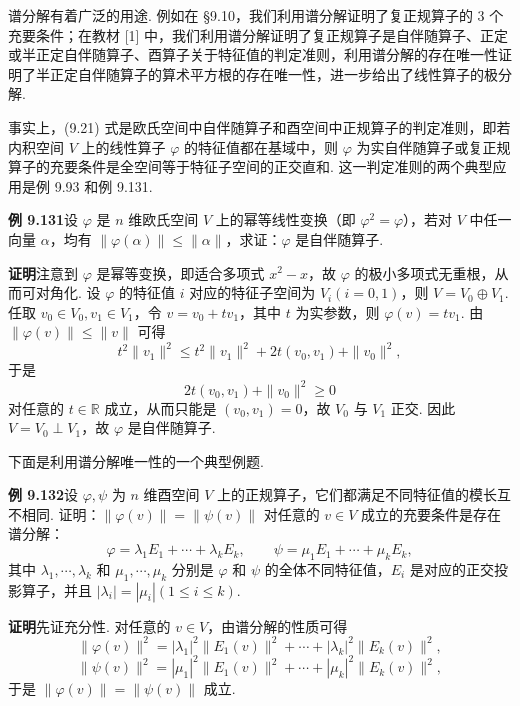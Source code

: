 \documentclass[UTF8, 12pt, fontset=fandol, oneside]{ctexart}
\begin{document}
谱分解有着广泛的用途. 例如在 §9.10，我们利用谱分解证明了复正规算子的 $3$ 个充要条件；在教材 [1] 中，我们利用谱分解证明了复正规算子是自伴随算子、正定或半正定自伴随算子、酉算子关于特征值的判定准则，利用谱分解的存在唯一性证明了半正定自伴随算子的算术平方根的存在唯一性，进一步给出了线性算子的极分解.

事实上，(9.21) 式是欧氏空间中自伴随算子和酉空间中正规算子的判定准则，即若内积空间 $V$ 上的线性算子 $\varphi$ 的特征值都在基域中，则 $\varphi$ 为实自伴随算子或复正规算子的充要条件是全空间等于特征子空间的正交直和. 这一判定准则的两个典型应用是例 9.93 和例 9.131.

\noindent\textbf{例 9.131}\quad 设 $\varphi$ 是 $n$ 维欧氏空间 $V$ 上的幂等线性变换（即 $\varphi^2=\varphi$），若对 $V$ 中任一向量 $\alpha$，均有 $\|\varphi(\alpha)\|\le\|\alpha\|$，求证：$\varphi$ 是自伴随算子.

\noindent\textbf{证明}\quad 注意到 $\varphi$ 是幂等变换，即适合多项式 $x^2-x$，故 $\varphi$ 的极小多项式无重根，从而可对角化. 设 $\varphi$ 的特征值 $i$ 对应的特征子空间为 $V_i(i=0,1)$，则 $V=V_0\oplus V_1$. 任取 $v_0\in V_0,v_1\in V_1$，令 $v=v_0+tv_1$，其中 $t$ 为实参数，则 $\varphi(v)=tv_1$. 由 $\|\varphi(v)\|\le\|v\|$ 可得
\[
t^2\|v_1\|^2\le t^2\|v_1\|^2+2t(v_0,v_1)+\|v_0\|^2,
\]
于是
\[
2t(v_0,v_1)+\|v_0\|^2\ge0
\]
对任意的 $t\in\mathbb{R}$ 成立，从而只能是 $(v_0,v_1)=0$，故 $V_0$ 与 $V_1$ 正交. 因此 $V=V_0\perp V_1$，故 $\varphi$ 是自伴随算子.

下面是利用谱分解唯一性的一个典型例题.

\noindent\textbf{例 9.132}\quad 设 $\varphi,\psi$ 为 $n$ 维酉空间 $V$ 上的正规算子，它们都满足不同特征值的模长互不相同. 证明：$\|\varphi(v)\|=\|\psi(v)\|$ 对任意的 $v\in V$ 成立的充要条件是存在谱分解：
\[
\varphi=\lambda_1E_1+\cdots+\lambda_kE_k,\qquad
\psi=\mu_1E_1+\cdots+\mu_kE_k,
\]
其中 $\lambda_1,\cdots,\lambda_k$ 和 $\mu_1,\cdots,\mu_k$ 分别是 $\varphi$ 和 $\psi$ 的全体不同特征值，$E_i$ 是对应的正交投影算子，并且 $|\lambda_i|=|\mu_i|(1\le i\le k)$.

\noindent\textbf{证明}\quad 先证充分性. 对任意的 $v\in V$，由谱分解的性质可得
\[
\|\varphi(v)\|^2=|\lambda_1|^2\|E_1(v)\|^2+\cdots+|\lambda_k|^2\|E_k(v)\|^2,
\]
\[
\|\psi(v)\|^2=|\mu_1|^2\|E_1(v)\|^2+\cdots+|\mu_k|^2\|E_k(v)\|^2,
\]
于是 $\|\varphi(v)\|=\|\psi(v)\|$ 成立.
\end{document}
